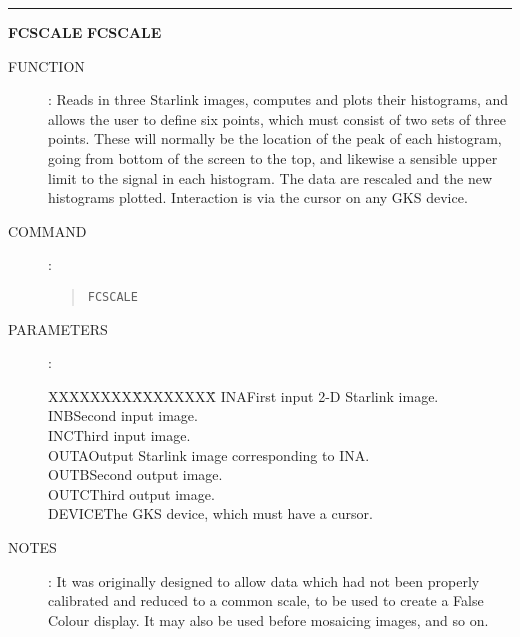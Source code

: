 \goodbreak
\rule{\textwidth}{0.3mm}
{\Large {\bf FCSCALE} \hfill {\bf FCSCALE}}
\begin{description}
\item [FUNCTION]:
Reads in three Starlink images, computes and plots their histograms, and
allows the user to define six points, which must consist of two sets of three
points.
These will normally be the location of the peak of each histogram, going from
bottom of the screen to the top, and likewise a sensible upper limit to the
signal in each histogram.
The data are rescaled and the new histograms plotted.
Interaction is via the cursor on any GKS device.
\item [COMMAND]:
\begin{quote}
{\tt FCSCALE}
\end{quote}
\item [PARAMETERS] :
\begin{tabbing}
XXXXXXXX\=XXXXXXXX\=\kill
INA\>\>First input 2-D Starlink image.\\
INB\>\>Second input image.\\
INC\>\>Third input image.\\
OUTA\>\>Output Starlink image corresponding to INA.\\
OUTB\>\>Second output image.\\
OUTC\>\>Third output image.\\
DEVICE\>\>The GKS device, which must have a cursor.
\end{tabbing}
\item [NOTES]:
It was originally designed to allow data which had not been properly calibrated
and reduced to a common scale, to be used to create a False Colour display.
It may also be used before mosaicing images, and so on.
\end{description}

